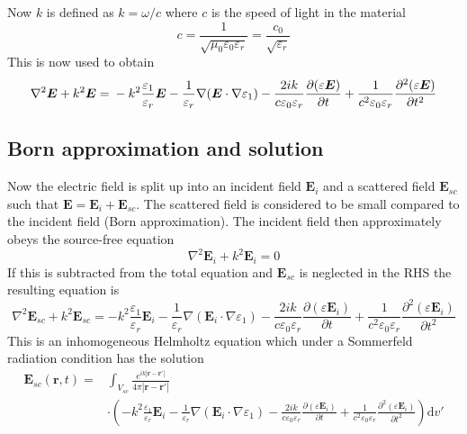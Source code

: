 \documentclass[11pt,twoside]{eitExjobb}
\begin{document}
	Now $k$ is defined as $k = \omega/c$ where $c$ is the speed of light in the material
	\begin{equation*}
		c = \frac{1}{\sqrt{\mu_0 \varepsilon_0 \varepsilon_r}} = \frac{c_0}{\sqrt{\varepsilon_r}}
	\end{equation*}
	This is now used to obtain
	\begin{equation*}
		\nabla^2\bm{E} + k^2 \bm{E} = \\
		-k^2 \frac{\varepsilon_1}{\varepsilon_r} \bm{E} -\frac{1}{\varepsilon_r}\nabla(\bm{E} \cdot \nabla \varepsilon_1) - \frac{2ik}{c\varepsilon_0\varepsilon_r} \frac{\partial (\varepsilon \bm{E})}{\partial t} + \frac{1}{c^2 \varepsilon_0 \varepsilon_r} \frac{\partial^2 (\varepsilon \bm{E})}{\partial t^2}
	\end{equation*}
	
	\subsection{Born approximation and solution}
	Now the electric field is split up into an incident field $\bm{E}_i$ and a scattered field $\bm{E}_{sc}$ such that $\bm{E} = \bm{E}_i + \bm{E}_{sc}$. The scattered field is considered to be small compared to the incident field (Born approximation). The incident field then approximately obeys the source-free equation
	\begin{equation*}
		\nabla^2 \bm{E}_{i} + k^2 \bm{E}_{i} = 0
	\end{equation*}
	If this is subtracted from the total equation and $\bm{E}_{sc}$ is neglected in the RHS the resulting equation is
	\begin{equation*}
		\nabla^2\bm{E}_{sc} + k^2 \bm{E}_{sc} =	-k^2 \frac{\varepsilon_1}{\varepsilon_r} \bm{E}_i -\frac{1}{\varepsilon_r}\nabla(\bm{E}_i \cdot \nabla \varepsilon_1) - \frac{2ik}{c\varepsilon_0\varepsilon_r} \frac{\partial (\varepsilon \bm{E}_i)}{\partial t} + \frac{1}{c^2 \varepsilon_0 \varepsilon_r} \frac{\partial^2 (\varepsilon \bm{E}_i)}{\partial t^2}
	\end{equation*}
	This is an inhomogeneous Helmholtz equation which under a Sommerfeld radiation condition has the solution \addref
	\begin{equation*}
	\begin{split}
		\bm{E}_{sc}(\bm{r},t) =& \int_{V_{sc}} \frac{e^{ik |\bm{r}-\bm{r'}| }}{4\pi |\bm{r}-\bm{r'}|} \\
		&\cdot \left( -k^2 \frac{\varepsilon_1}{\varepsilon_r} \bm{E}_i -\frac{1}{\varepsilon_r}\nabla(\bm{E}_i \cdot \nabla \varepsilon_1)- \frac{2ik}{c\varepsilon_0\varepsilon_r} \frac{\partial (\varepsilon \bm{E}_i)}{\partial t} + \frac{1}{c^2 \varepsilon_0 \varepsilon_r} \frac{\partial^2 (\varepsilon \bm{E}_i)}{\partial t^2} \right) \mathrm{d}v'
	\end{split}
	\end{equation*}
	
\end{document}
